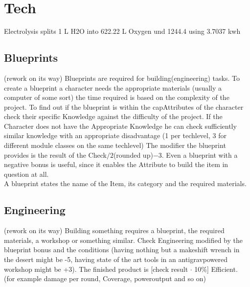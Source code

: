 \section{Tech}\label{subsec:tech}
Electrolysis splits 1 L H2O into 622.22 L Oxygen und 1244.4 using 3.7037 kwh\\
\subsection{Blueprints}
(rework on its way)
Blueprints are required for building(engineering) tasks.
To create a blueprint a character needs the appropriate materials
(usually a computer of some sort) the time required is based on the complexity of the project.
To find out if the
blueprint is within the capAttributes of the character check their specific Knowledge against the difficulty of the
project.
If the Character does not have the Appropriate Knowledge he can check sufficiently similar knowledge with
an appropriate disadvantage (1 per techlevel, 3 for different module classes on the same techlevel)
The modifier the blueprint provides is the result of the Check\(/2\)(rounded up)\(-3\).
Even a blueprint with a negative bonus is useful, since it enables the Attribute to build the item in question at all.\\
A blueprint states the name of the Item, its category and the required materials.\vspace{1.5cm}
\subsection{Engineering}
(rework on its way)
Building something requires a blueprint, the required materials, a workshop or something similar.
Check Engineering
modified by the blueprint bonus and the conditions (having nothing but a makeshift wrench in the desert might be -5, having state of the art
tools in an antigravpowered workshop might be +3).
The finished product is [check result \(\cdot\) 10\%] Efficient.
(for example damage per round, Coverage, poweroutput and so on)\vspace{1.5cm}